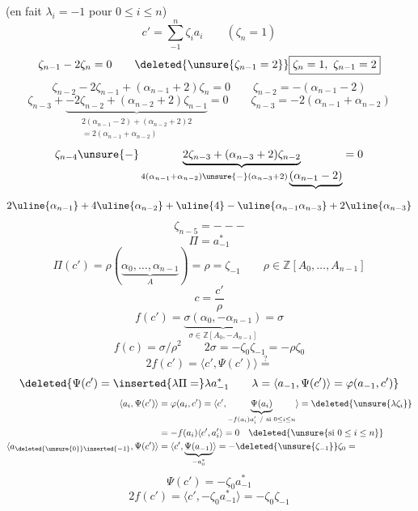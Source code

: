 (en fait $\lambda_i=-1$ pour $0\leq i\leq n$)
\[
c'=\sum_{-1}^{n}\zeta_i a_i\qquad(\zeta_n=1)
\]
\[
\zeta_{n-1}-2\zeta_n=0\qquad
\deleted{\unsure{\zeta_{n-1}=2}}
\boxed{\zeta_n=1,\ \zeta_{n-1}=2}
\]
\[
\zeta_{n-2}-2\zeta_{n-1}+(\alpha_{n-1}+2)\zeta_n=0
\qquad\boxed{\zeta_{n-2}=-(\alpha_{n-1}-2)}
\]
\[
\zeta_{n-3}
+\underbrace{-2\zeta_{n-2}+(\alpha_{n-2}+2)\zeta_{n-1}}_{
\begin{smallmatrix}2(\alpha_{n-1}-2)+(\alpha_{n-2}+2)2\\
=2(\alpha_{n-1}+\alpha_{n-2})\end{smallmatrix}}
=0
\qquad\boxed{\zeta_{n-3}=-2(\alpha_{n-1}+\alpha_{n-2})}
\]
\[
\zeta_{n-4}\unsure{-} \underbrace{
2\zeta_{n-3}+(\alpha_{n-3}+2)\zeta_{n-2}}_{
4(\alpha_{n-1}+\alpha_{n-2})\unsure{-}(\alpha_{n-3}+2)
\underbrace{(\alpha_{n-1}-2)}}
=0
\]
\margin{\[
\boxed{\begin{aligned}
\zeta_{n-4}&=\deleted{\unsure{\alpha_{n-1}(\alpha_{n-3}+2)+4\alpha_{n-2}+4+}}\\
&-4-2(\alpha_{n-1}+2\alpha_{n-2}+\alpha_{n-3})
+\alpha_{n-1}\alpha_{n-3}
\end{aligned}}
\]}
\[
2\uline{\alpha_{n-1}}+4\uline{\alpha_{n-2}}+\uline{4}
-\uline{\alpha_{n-1}\alpha_{n-3}}+2\uline{\alpha_{n-3}}
\]
\[
\zeta_{n-5}=\mathbin{---}
\]
\[
\Pi=a_{-1}^*
\]
\[
\Pi(c')=\rho(\underbrace{\alpha_0,\ldots,\alpha_{n-1}}_A)
=\rho=\zeta_{-1}
\qquad\rho\in\mathbb Z[A_0,\ldots,A_{n-1}]
\]
\[
c=\frac{c'}{\rho}
\]
\[
f(c')=\underbrace{\sigma(\alpha_0,\mathbin{-}\alpha_{n-1})}_{
\sigma\in\mathbb Z[A_0,\mathbin{-}A_{n-1}]}
=\sigma
\]
\[
f(c)=\sigma/\rho^2\qquad
2\sigma=-\zeta_0\zeta_{-1}=-\rho\zeta_0
\]
\[
2f(c')=\langle c',\Psi(c')\rangle\overset{?}{=}
\]
\[
\deleted{\Psi(c')=\inserted{\lambda\Pi=}\lambda a_{-1}^*
\qquad\lambda=\langle a_{-1},\Psi(c')\rangle
=\varphi(a_{-1},c')}
\]
\[
\begin{aligned}
\langle a_i,\Psi(c')\rangle
&=\varphi(a_i,c')=\langle c',\underbrace{\Psi(a_i)}_{
-f(a_i)a'_i\ /\ \text{si }0\leq i\leq n}\rangle
=\deleted{\unsure{\lambda\zeta_i}}\\
&=-f(a_i)\langle c',a'_i\rangle
=0\quad\deleted{\unsure{\text{si }0\leq i\leq n}}\\
\langle a_{\deleted{\unsure{0}}\inserted{-1}},\Psi(c')\rangle
&=\langle c',\underbrace{\Psi(a_{-1})}_{-a_0^*}\rangle
=-\deleted{\unsure{\zeta_{-1}}}\zeta_0=
\end{aligned}
\]
\[
\Psi(c')=-\zeta_0a_{-1}^*
\]
\[
2f(c')=\langle c',-\zeta_0a_{-1}^*\rangle=-\zeta_0\zeta_{-1}
\]

